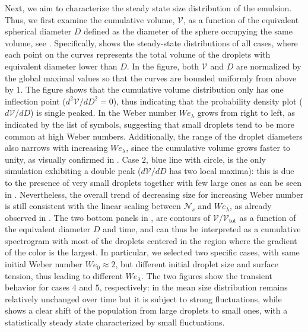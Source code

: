 Next, we aim to characterize the steady state size distribution of the emulsion. Thus, we first examine the cumulative volume, $\mathcal{V}$, as a function of the equivalent spherical diameter $D$ defined as the diameter of the sphere occupying the same volume, see . Specifically,  shows the steady-state distributions of all cases, where each point on the curves represents the total volume of the droplets with equivalent diameter lower than $D$. In the figure, both $\mathcal{V}$ and $D$ are normalized by the global maximal values so that the curves are bounded uniformly from above by $1$. The figure shows that the cumulative volume distribution only has one inflection point ($d^2 \mathcal{V}/dD^2 = 0$), thus indicating that the probability density plot ($d \mathcal{V}/dD$) is single peaked. In  the Weber number $We_\lambda$ grows from right to left, as indicated by the list of symbols, suggesting that small droplets tend to be more common at high Weber numbers. Additionally, the range of the droplet diameters also narrows with increasing $We_\lambda$, since the cumulative volume grows faster to unity, as visually confirmed in . Case $2$, blue line with circle, is the only simulation exhibiting a double peak (\ie $d \mathcal{V}/dD$ has two local maxima): this is due to the presence of very small droplets together with few large ones as can be seen in . Nevertheless, the overall trend of decreasing size for increasing Weber number is still consistent with the linear scaling between $\mathcal{N}_s$ and $We_\lambda$, as already observed in . The two bottom panels in , are contours of $\mathcal{V}/\mathcal{V}_\textrm{tot}$ as a function of the equivalent diameter $D$ and time, and can thus be interpreted as a cumulative spectrogram with most of the droplets centered in the region where the gradient of the color is the largest. In particular, we selected two specific cases, with same initial Weber number $We_0 \approx 2$, but different initial droplet size and surface tension, thus leading to different $We_\lambda$. The two figures show the transient behavior for cases $4$ and $5$, respectively: in  the mean size distribution remains relatively unchanged over time but it is subject to strong fluctuations, while  shows a clear shift of the population from large droplets to small ones, with a statistically steady state characterized by small fluctuations.

